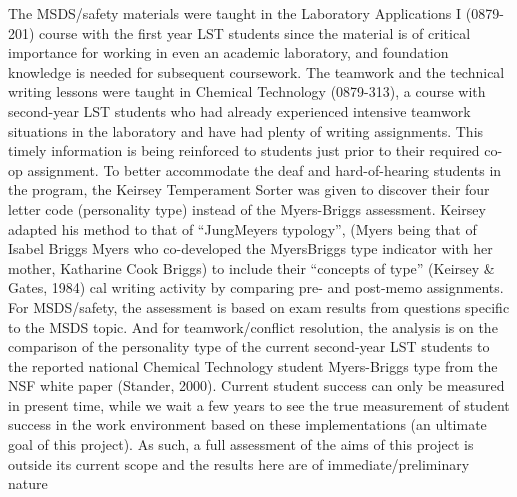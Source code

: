 \documentclass[11.5pt]{sig-alternate} %
\begin{document}
\begin{large}
The MSDS/safety materials were taught in the Laboratory Applications I (0879-201) course with the first year LST students since the material is of critical importance for working in even an academic laboratory, and foundation knowledge is needed for subsequent coursework. The teamwork and the technical writing lessons were taught in Chemical Technology (0879-313), a course with second-year LST students who had already experienced intensive teamwork situations in the laboratory and have had plenty of writing assignments. This timely information is being reinforced to students just prior to their required co-op assignment. To better accommodate the deaf and hard-of-hearing students in the program, the Keirsey Temperament Sorter was given to discover their four letter code (personality type) instead of the Myers-Briggs assessment. Keirsey adapted his method to that of “JungMeyers typology”, (Myers being that of Isabel Briggs Myers who co-developed the MyersBriggs type indicator with her mother, Katharine Cook Briggs) to include their “concepts of type” (Keirsey \& Gates, 1984) cal writing activity by comparing pre- and post-memo assignments. For MSDS/safety, the assessment is based on exam results from questions specific to the MSDS topic. And for teamwork/conflict resolution, the analysis is on the comparison of the personality type of the current second-year LST students to the reported national Chemical Technology student Myers-Briggs type from the NSF white paper (Stander, 2000). Current student success can only be measured in present time, while we wait a few years to see the true measurement of student success in the work environment based on these implementations (an ultimate goal of this project). As such, a full assessment of the aims of this project is outside its current scope and the results here are of immediate/preliminary nature


\end{large}
\end{document}
